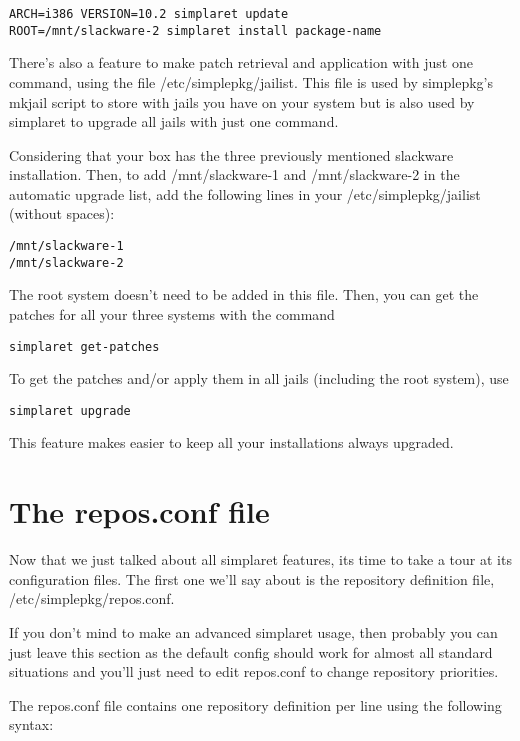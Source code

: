 \documentclass{article}
\begin{document}
\begin{verbatim}
ARCH=i386 VERSION=10.2 simplaret update
ROOT=/mnt/slackware-2 simplaret install package-name
\end{verbatim}

There's also a feature to make patch retrieval and application with just one command, using the file /etc/simplepkg/jailist. This file is used by simplepkg's mkjail script to store with jails you have on your system but is also used by simplaret to upgrade all jails with just one command.

Considering that your box has the three previously mentioned slackware installation. Then, to add /mnt/slackware-1 and /mnt/slackware-2 in the automatic upgrade list, add the following lines in your /etc/simplepkg/jailist (without spaces):

\begin{verbatim}
/mnt/slackware-1
/mnt/slackware-2
\end{verbatim}

The root system doesn't need to be added in this file. Then, you can get the patches for all your three systems with the command

\begin{verbatim}
simplaret get-patches
\end{verbatim}

To get the patches and/or apply them in all jails (including the root system), use

\begin{verbatim}
simplaret upgrade
\end{verbatim}

This feature makes easier to keep all your installations always upgraded.

\section{The repos.conf file}

Now that we just talked about all simplaret features, its time to take a tour at its configuration files. The first one we'll say about is the repository definition file, /etc/simplepkg/repos.conf.

If you don't mind to make an advanced simplaret usage, then probably you can just leave this section as the default config should work for almost all standard situations and you'll just need to edit repos.conf to change repository priorities.

The repos.conf file contains one repository definition per line using the following syntax:
\end{document}
